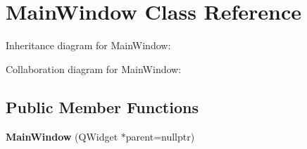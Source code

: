 \hypertarget{classMainWindow}{}\section{Main\+Window Class Reference}
\label{classMainWindow}


Inheritance diagram for Main\+Window\+:


Collaboration diagram for Main\+Window\+:
\subsection*{Public Member Functions}
\begin{DoxyCompactItemize}
\item 
\mbox{\label{classMainWindow_a996c5a2b6f77944776856f08ec30858d}} 
{\bfseries Main\+Window} (Q\+Widget $\ast$parent=nullptr)
\end{DoxyCompactItemize}

